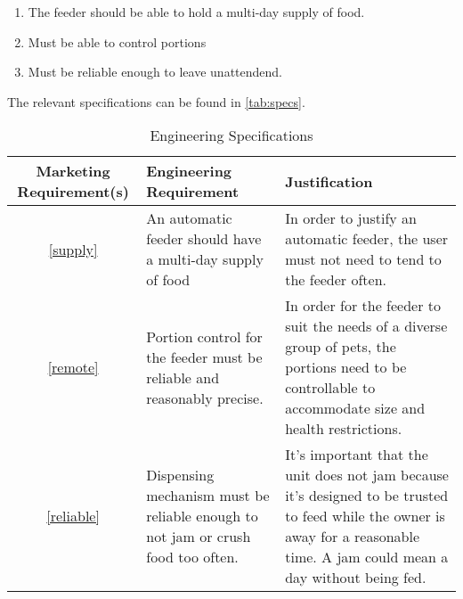 \documentclass[12pt]{article}
\newcounter{engineering}
\begin{document}
\begin{enumerate}
    \item\label{supply} The feeder should be able to hold a multi-day supply of food.
    \item\label{remote} Must be able to control portions
    \item\label{reliable} Must be reliable enough to leave unattendend.
\end{enumerate}
The relevant specifications can be found in \autoref{tab:specs}.

\begin{table}[H]
    \centering
    \caption{Engineering Specifications}
    \label{tab:specs}
    \begin{tabularx}{\linewidth}{cXX} \toprule
        Marketing Requirement(s) & Engineering Requirement & Justification \\ \midrule
        \ref{supply}             &  An automatic feeder should have a multi-day supply of food & In order to justify an automatic feeder, the user must not need to tend to the feeder often.\\
        \ref{remote}              & Portion control for the feeder must be reliable and reasonably precise. & In order for the feeder to suit the needs of a diverse group of pets, the portions need to be controllable to accommodate size and health restrictions. \\
        \ref{reliable}            & Dispensing mechanism must be reliable enough to not jam or crush food too often.& It’s important that the unit does not jam because it’s designed to be trusted to feed while the owner is away for a reasonable time. A jam could mean a day without being fed.\\
    \end{tabularx}
\end{table}

\end{document}

